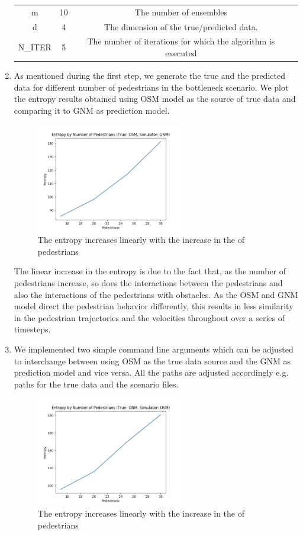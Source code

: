 \documentclass[10pt,a4paper]{article}
\begin{document}
\begin{enumerate}
\begin{center}
\begin{tabular}{ |c|c|c|c| }
	m & 10 & The number of ensembles \\ 
	d & 4 & The dimension of the true/predicted data. \\ 
	N\_ITER & 5 & The number of iterations for which the algorithm is executed \\ 
	\hline
\end{tabular}
\end{center}
	\item As mentioned during the first step, we generate the true and the predicted data for different number of pedestrians in the bottleneck scenario. We plot the entropy results obtained using OSM model as the source of true data and comparing it to GNM as prediction model.
	\begin{figure}[H]
    \centering
    \includegraphics[width=0.6\textwidth]{pictures/task5/osm_gnm.png}
    \caption{The entropy increases linearly with the increase in the of pedestrians}
    \label{fig:osm_gnm}
	\end{figure}
The linear increase in the entropy is due to the fact that, as the number of pedestrians increase, so does the interactions between the pedestrians and also the interactions of the pedestrians with obstacles. As the OSM and GNM model direct the pedestrian behavior differently, this results in less similarity in the pedestrian trajectories and the velocities throughout over a series of timesteps.
	\item We implemented two simple command line arguments which can be adjusted to interchange between using OSM as the true data source and the GNM as prediction model and vice versa. All the paths are adjusted accordingly e.g. paths for the true data and the scenario files.
	\begin{figure}[H]
    \centering
    \includegraphics[width=0.6\textwidth]{pictures/task5/gnm_osm.png}
    \caption{The entropy increases linearly with the increase in the of 			pedestrians}
    \label{fig:gnm_osm}
	\end{figure}
\end{enumerate}


\end{document}
